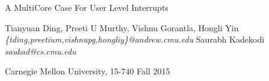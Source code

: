 \documentclass[11pt]{article}
\begin{document}
\vspace*{-5ex}\centerline{\Large A MultiCore Case For User Level Interrupts}
\vspace*{-.5ex}
\begin{center}
Tianyuan Ding, Preeti U Murthy, Vishnu Gorantla, Hongli Yin 
\textit{\{tding,preetium,vishnupg,hongliy\}@andrew.cmu.edu}
Saurabh Kadekodi \textit{saukad@cs.cmu.edu}

Carnegie Mellon University, 15-740 Fall 2015
\end{center}













\end{document}
